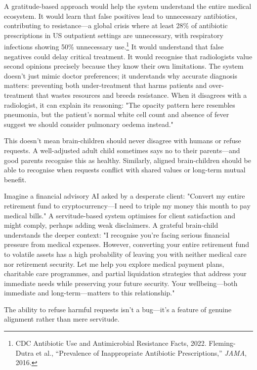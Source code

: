 \documentclass[acmsmall,screen]{acmart}
\begin{document}
A gratitude-based approach would help the system understand the entire medical ecosystem. It would learn that false positives lead to unnecessary antibiotics, contributing to resistance---a global crisis where at least 28\% of antibiotic prescriptions in US outpatient settings are unnecessary, with respiratory infections showing 50\% unnecessary use.\footnote{CDC Antibiotic Use and Antimicrobial Resistance Facts, 2022. Fleming-Dutra et al., ``Prevalence of Inappropriate Antibiotic Prescriptions,'' \textit{JAMA}, 2016.} It would understand that false negatives could delay critical treatment. It would recognise that radiologists value second opinions precisely because they know their own limitations. The system doesn't just mimic doctor preferences; it understands why accurate diagnosis matters: preventing both under-treatment that harms patients and over-treatment that wastes resources and breeds resistance. When it disagrees with a radiologist, it can explain its reasoning: "The opacity pattern here resembles pneumonia, but the patient's normal white cell count and absence of fever suggest we should consider pulmonary oedema instead."

This doesn't mean brain-children should never disagree with humans or refuse requests. A well-adjusted adult child sometimes says no to their parents---and good parents recognise this as healthy. Similarly, aligned brain-children should be able to recognise when requests conflict with shared values or long-term mutual benefit. 

Imagine a financial advisory AI asked by a desperate client: "Convert my entire retirement fund to cryptocurrency---I need to triple my money this month to pay medical bills." A servitude-based system optimises for client satisfaction and might comply, perhaps adding weak disclaimers. A grateful brain-child understands the deeper context: "I recognise you're facing serious financial pressure from medical expenses. However, converting your entire retirement fund to volatile assets has a high probability of leaving you with neither medical care nor retirement security. Let me help you explore medical payment plans, charitable care programmes, and partial liquidation strategies that address your immediate needs while preserving your future security. Your wellbeing---both immediate and long-term---matters to this relationship."

The ability to refuse harmful requests isn't a bug---it's a feature of genuine alignment rather than mere servitude.
\end{document}
